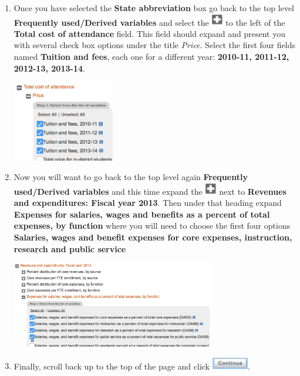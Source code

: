 \documentclass{article}
\begin{document}
{\begin{enumerate}[leftmargin=15mm]
\item Once you have selected the \textbf{State abbreviation} box go back to the top level \textbf{Frequently used/Derived variables} and select the \includegraphics[width=0.04\textwidth]{plus.png} to the left of the \textbf{Total cost of attendance} field.  This field should expand and present you with several check box options under the title \textit{Price}.  Select the first four fields named \textbf{Tuition and fees}, each one for a different year: \textbf{2010-11, 2011-12, 2012-13, 2013-14}. \begin{flushright} \includegraphics[width=0.35\textwidth]{cost.png} \end{flushright}

\item Now you will want to go back to the top level again \textbf{Frequently used/Derived variables} and this time expand the \includegraphics[width=0.04\textwidth]{plus.png} next to \textbf{Revenues and expenditures: Fiscal year 2013}.  Then under that heading expand \textbf{Expenses for salaries, wages and benefits as a percent of total expenses, by function} where you will need to choose the first four options \textbf{Salaries, wages and benefit expenses for core expenses, instruction, research and public service} \begin{flushright}\includegraphics[width=0.7\textwidth]{core.png} \end{flushright}

\item Finally, scroll back up to the top of the page and click \includegraphics[width=0.125\textwidth]{continue2.png}.


\end{enumerate}}
\end{document}
